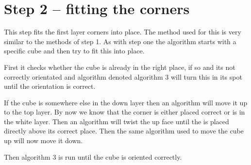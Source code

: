 \section{Step 2 -- fitting the corners}
This step fits the first layer corners into place. The method used for this is very similar to the methods of step 1. As with step one the algorithm starts with a specific cube and then try to fit this into place.  

First it checks whether the cube is already in the right place, if so and its not correctly orientated and algorithm denoted algorithm 3 will turn this \cpiece{} in its spot until the orientation is correct. 

If the cube is somewhere else in the down layer then an algorithm will move it up to the top layer. By now we know that the corner \cpiece{} is either placed correct or is in the white layer. Then an algorithm will twist the up face until the \cpiece{} is placed directly above its correct place. Then the same algorithm used to move the cube up will now move it down. 

Then algorithm 3 is run until the cube is oriented correctly.

